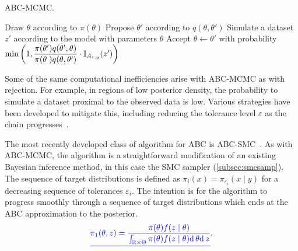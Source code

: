 \begin{algorithm}
  \caption{\gls{ABC}-\gls{MCMC}.}
  \begin{algorithmic}
    \State Draw $\theta$ according to $\pi(\theta)$
    \Loop
      \State Propose $\theta'$ according to $q(\theta, \theta')$
      \State Simulate a dataset $z'$ according to the model with parameters
             $\theta$
      \State Accept $\theta \gets \theta'$ with probability
      $\min \left( 1, 
       \dfrac{\pi(\theta') q(\theta', \theta)}
             {\pi(\theta\phantom{'}) q(\theta, \theta')} 
       \cdot \mathbb{I}_{A_{\varepsilon, y}}(z') \right)$
    \EndLoop
  \end{algorithmic}
  \label{alg:abcmcmc}
\end{algorithm}

Some of the same computational inefficiencies arise with \gls{ABC}-\gls{MCMC}
as with rejection. For example, in regions of low posterior density, the
probability to simulate a dataset proximal to the observed data is low. Various
strategies have been developed to mitigate this, including reducing the
tolerance level $\varepsilon$ as the chain
progresses~\autocite{ratmann2007using}.

The most recently developed class of algorithm for \gls{ABC} is
\gls{ABC}-\gls{SMC}~\autocite{sisson2007sequential, beaumont2009adaptive}. As
with \gls{ABC}-\gls{MCMC}, the algorithm is a straightforward modification of
an existing Bayesian inference method, in this case the \gls{SMC} sampler
(\cref{subsec:smcsamp}). The sequence of target distributions is defined as
$\pi_i(x) = \pi_{\varepsilon_i}(x \mid y)$ for a decreasing sequence of
tolerances $\varepsilon_i$. The intention is for the algorithm to progress
smoothly through a sequence of target distributions which ends at the \gls{ABC}
approximation to the posterior. 
\[
  \color{blue}\underline{\pi_1(\theta, z) = \frac{\pi(\theta) f(z \mid \theta)}
  {\int_{\mathbb{R} \times \Theta} \pi(\theta) f(z \mid \theta) \mathrm{d}\,\theta \mathrm{d}\, z}} \color{black}.
\]

